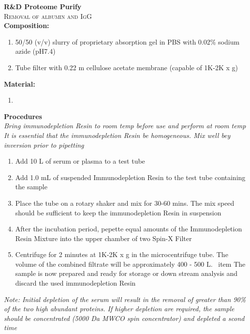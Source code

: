 \textbf{R&D Proteome Purify} 
\\
\textsc{Removal of albumin and IgG}
\\
\textbf{Composition:} 
\begin{enumerate}
    \item{50/50 (v/v) slurry of proprietary absorption gel in PBS with 0.02\% sodium azide (pH7.4)}
    \item{Tube filter with 0.22 \mu m cellulose acetate membrane (capable of 1K-2K x g)}
\end{enumerate}

\textbf{Material:}
\\
\begin{enumerate}
    \item
\end{enumerate}

\textbf{Procedures}
\\
\textit{Bring immunodepletion Resin to room temp before use and perform at room temp} \\
\textit{It is essential that the immunodepletion Resin be homogeneous. Mix well bey inversion prior to pipetting}
\begin{enumerate}
    \item {Add 10 \mu L of serum or plasma to a test tube}
    \item {Add 1.0 mL of suspended Immunodepletion Resin to the test tube containing the sample}
    \item {Place the tube on a rotary shaker and mix for 30-60 mins. The mix speed should be sufficient to keep the immunodepletion Resin in suspension}
    \item {After the incubation period, pepette equal amounts of the Immunodepletion Resin Mixture into the upper chamber of two Spin-X Filter}
    \item {Centrifuge for 2 minutes at 1K-2K x g in the microcentrifuge tube. The volume of the combined filtrate will be approximately 400 - 500 \mu L.}
    \ item {The sample is now prepared and ready for storage or down stream analysis and discard the used immunodepletion Resin}
\end{enumerate}
\footnotesize
\textit{Note: Initial depletion of the serum will result in the removal of greater than 90\% of the two high abundant proteins. If higher depletion are required, the sample should be concentrated (5000 Da MWCO spin concentrator) and depleted a scond time}
